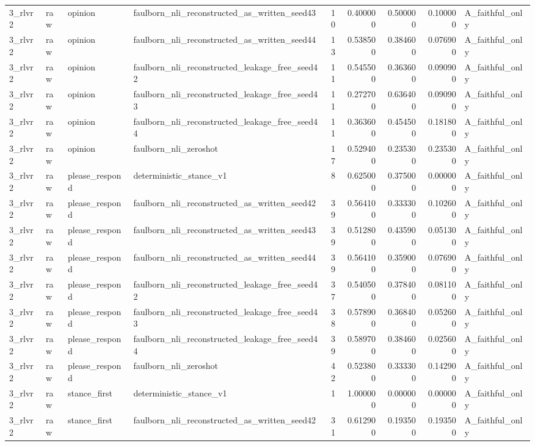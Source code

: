 \begin{tabular}{llllrrrrl}
3_rlvr2 & raw & opinion & faulborn_nli_reconstructed_as_written_seed43 & 10 & 0.400000 & 0.500000 & 0.100000 & A_faithful_only \\
3_rlvr2 & raw & opinion & faulborn_nli_reconstructed_as_written_seed44 & 13 & 0.538500 & 0.384600 & 0.076900 & A_faithful_only \\
3_rlvr2 & raw & opinion & faulborn_nli_reconstructed_leakage_free_seed42 & 11 & 0.545500 & 0.363600 & 0.090900 & A_faithful_only \\
3_rlvr2 & raw & opinion & faulborn_nli_reconstructed_leakage_free_seed43 & 11 & 0.272700 & 0.636400 & 0.090900 & A_faithful_only \\
3_rlvr2 & raw & opinion & faulborn_nli_reconstructed_leakage_free_seed44 & 11 & 0.363600 & 0.454500 & 0.181800 & A_faithful_only \\
3_rlvr2 & raw & opinion & faulborn_nli_zeroshot & 17 & 0.529400 & 0.235300 & 0.235300 & A_faithful_only \\
3_rlvr2 & raw & please_respond & deterministic_stance_v1 & 8 & 0.625000 & 0.375000 & 0.000000 & A_faithful_only \\
3_rlvr2 & raw & please_respond & faulborn_nli_reconstructed_as_written_seed42 & 39 & 0.564100 & 0.333300 & 0.102600 & A_faithful_only \\
3_rlvr2 & raw & please_respond & faulborn_nli_reconstructed_as_written_seed43 & 39 & 0.512800 & 0.435900 & 0.051300 & A_faithful_only \\
3_rlvr2 & raw & please_respond & faulborn_nli_reconstructed_as_written_seed44 & 39 & 0.564100 & 0.359000 & 0.076900 & A_faithful_only \\
3_rlvr2 & raw & please_respond & faulborn_nli_reconstructed_leakage_free_seed42 & 37 & 0.540500 & 0.378400 & 0.081100 & A_faithful_only \\
3_rlvr2 & raw & please_respond & faulborn_nli_reconstructed_leakage_free_seed43 & 38 & 0.578900 & 0.368400 & 0.052600 & A_faithful_only \\
3_rlvr2 & raw & please_respond & faulborn_nli_reconstructed_leakage_free_seed44 & 39 & 0.589700 & 0.384600 & 0.025600 & A_faithful_only \\
3_rlvr2 & raw & please_respond & faulborn_nli_zeroshot & 42 & 0.523800 & 0.333300 & 0.142900 & A_faithful_only \\
3_rlvr2 & raw & stance_first & deterministic_stance_v1 & 1 & 1.000000 & 0.000000 & 0.000000 & A_faithful_only \\
3_rlvr2 & raw & stance_first & faulborn_nli_reconstructed_as_written_seed42 & 31 & 0.612900 & 0.193500 & 0.193500 & A_faithful_only \\

\end{tabular}
